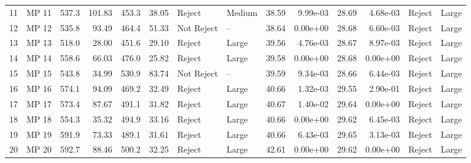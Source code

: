 \begin{tabular}{llrrrrllrrrrll}
11 &  MP 11 &              537.3 &  101.83 &               453.3 &  38.05 &      Reject &      Medium &                    38.59 &  9.99e-03 &                     28.69 &  4.68e-03 &  Reject &       Large \\
12 &  MP 12 &              535.8 &   93.49 &               464.4 &  51.33 &  Not Reject &          -- &                    38.64 &  0.00e+00 &                     28.68 &  6.60e-03 &  Reject &       Large \\
13 &  MP 13 &              518.0 &   28.00 &               451.6 &  29.10 &      Reject &       Large &                    39.56 &  4.76e-03 &                     28.67 &  8.97e-03 &  Reject &       Large \\
14 &  MP 14 &              558.6 &   66.03 &               476.0 &  25.82 &      Reject &       Large &                    39.58 &  0.00e+00 &                     28.68 &  0.00e+00 &  Reject &       Large \\
15 &  MP 15 &              543.8 &   34.99 &               530.9 &  83.74 &  Not Reject &          -- &                    39.59 &  9.34e-03 &                     28.66 &  6.44e-03 &  Reject &       Large \\
16 &  MP 16 &              574.1 &   94.09 &               469.2 &  32.49 &      Reject &       Large &                    40.66 &  1.32e-03 &                     29.55 &  2.90e-01 &  Reject &       Large \\
17 &  MP 17 &              573.4 &   87.67 &               491.1 &  31.82 &      Reject &       Large &                    40.67 &  1.40e-02 &                     29.64 &  0.00e+00 &  Reject &       Large \\
18 &  MP 18 &              554.3 &   35.32 &               494.9 &  33.16 &      Reject &       Large &                    40.66 &  0.00e+00 &                     29.62 &  6.45e-03 &  Reject &       Large \\
19 &  MP 19 &              591.9 &   73.33 &               489.1 &  31.61 &      Reject &       Large &                    40.66 &  6.43e-03 &                     29.65 &  3.13e-03 &  Reject &       Large \\
20 &  MP 20 &              592.7 &   88.46 &               500.2 &  32.25 &      Reject &       Large &                    42.61 &  0.00e+00 &                     29.62 &  0.00e+00 &  Reject &       Large \\
\bottomrule
\end{tabular}
